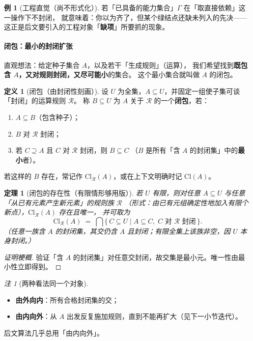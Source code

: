 \documentclass[UTF8,a4paper,11pt]{ctexart}
\theoremstyle{definition}
\newtheorem{definition}{定义}[section]
\newtheorem{example}{例}[section]
\theoremstyle{plain}
\newtheorem{theorem}{定理}[section]
\theoremstyle{remark}
\newtheorem{remark}{注}[section]
\numberwithin{figure}{section}
\numberwithin{table}{section}
\begin{document}
\begin{example}[工程直觉（尚不形式化）]
若「已具备的能力集合」$\Gamma$ 在「取直接依赖」这一操作下不封闭，
就意味着：你以为齐了，但某个绿结点还缺未列入的先决——这正是后文要引入的工程对象「\textbf{缺项}」所要抓的现象。
\end{example}

\paragraph{闭包：最小的封闭扩张}

直观想法：给定种子集合 $A$，以及若干「生成规则」（运算），
我们希望找到\textbf{既包含 $A$，又对规则封闭，又尽可能小}的集合。
这个最小集合就叫做 $A$ 的闭包。

\begin{definition}[闭包（由封闭性刻画）]
设 $U$ 为全集，$A\subseteq U$，并固定一组使子集可谈「封闭」的运算规则 $\mathcal{R}$。
称 $B\subseteq U$ 为 $A$ 关于 $\mathcal{R}$ 的一个\textbf{闭包}，若：
\begin{enumerate}
  \item $A\subseteq B$（包含种子）；
  \item $B$ 对 $\mathcal{R}$ 封闭；
  \item 若 $C\supseteq A$ 且 $C$ 对 $\mathcal{R}$ 封闭，则 $B\subseteq C$
        （$B$ 是所有「含 $A$ 的封闭集」中的\textbf{最小}者）。
\end{enumerate}
若这样的 $B$ 存在，常记作 $\mathrm{Cl}_{\mathcal{R}}(A)$，或在上下文明确时记 $\mathrm{Cl}(A)$。
\end{definition}

\begin{theorem}[闭包的存在性（有限情形够用版）]
若 $U$ 有限，则对任意 $A\subseteq U$ 与任意「从已有元素产生新元素」的规则族 $\mathcal{R}$
（形式：由已有元组确定性地加入有限个新点），$\mathrm{Cl}_{\mathcal{R}}(A)$ 存在且唯一，
并可取为
\[
\mathrm{Cl}_{\mathcal{R}}(A)
\;=\;
\bigcap\{\,C\subseteq U\mid A\subseteq C,\; C\text{ 对 }\mathcal{R}\text{ 封闭}\,\}.
\]
（任意一族含 $A$ 的封闭集，其交仍含 $A$ 且封闭；有限全集上该族非空，因 $U$ 本身封闭。）
\end{theorem}
\begin{proof}[证明梗概]
验证「含 $A$ 的封闭集」对任意交封闭，故交集是最小元。唯一性由最小性立即得到。
\end{proof}

\begin{remark}[两种看法同一个对象]
\begin{itemize}
  \item \textbf{由外向内}：所有合格封闭集的交；
  \item \textbf{由内向外}：从 $A$ 出发反复施加规则，直到不能再扩大（见下一小节迭代）。
\end{itemize}
后文算法几乎总用「由内向外」。
\end{remark}
\end{document}
